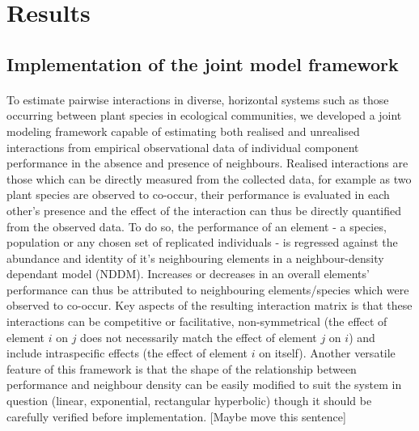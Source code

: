 \documentclass[a4,12pt]{article}
\begin{document}
\section{Results}


    \subsection{Implementation of the joint model framework}

    \paragraph{}
        To estimate pairwise interactions in diverse, horizontal systems such as those occurring between plant species in ecological communities, we developed a joint modeling framework capable of estimating both realised and unrealised interactions from empirical observational data of individual component performance in the absence and presence of neighbours. Realised interactions are those which can be directly measured from the collected data, for example as two plant species are observed to co-occur, their performance is evaluated in each other's presence and the effect of the interaction can thus be directly quantified from the observed data. To do so, the performance of an element - a species, population or any chosen set of replicated individuals - is regressed against the abundance and identity of it's neighbouring elements in a neighbour-density dependant model (NDDM).  Increases or decreases in an overall elements' performance can thus be attributed to neighbouring elements/species which were observed to co-occur. Key aspects of the resulting interaction matrix is that these interactions can be competitive or facilitative, non-symmetrical (the effect of element $i$ on $j$ does not necessarily match the effect of element $j$ on $i$) and include intraspecific effects (the effect of element $i$ on itself). Another versatile feature of this framework is that the shape of the relationship between performance and neighbour density can be easily modified to suit the system in question (linear, exponential, rectangular hyperbolic) though it should be carefully verified before implementation. [Maybe move this sentence]
\end{document}
